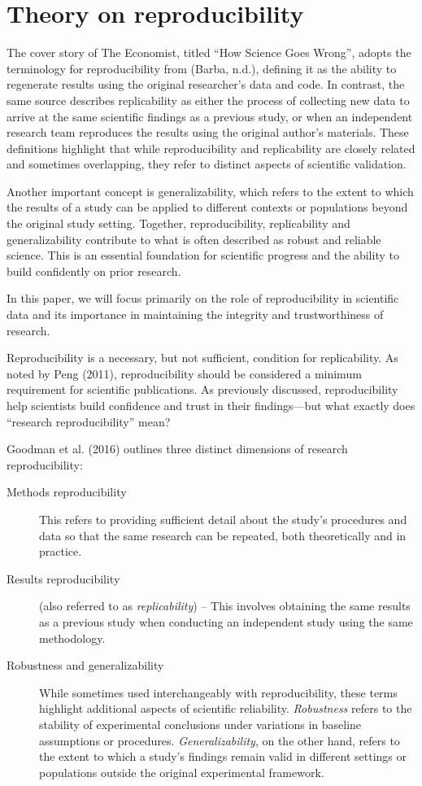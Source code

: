 \documentclass[
  a4paper,
]{article}
\begin{document}
\section{Theory on reproducibility}\label{theory-on-reproducibility}

The cover story of The Economist, titled ``How Science Goes Wrong'',
adopts the terminology for reproducibility from (Barba, n.d.), defining
it as the ability to regenerate results using the original researcher's
data and code. In contrast, the same source describes replicability as
either the process of collecting new data to arrive at the same
scientific findings as a previous study, or when an independent research
team reproduces the results using the original author's materials. These
definitions highlight that while reproducibility and replicability are
closely related and sometimes overlapping, they refer to distinct
aspects of scientific validation.

Another important concept is generalizability, which refers to the
extent to which the results of a study can be applied to different
contexts or populations beyond the original study setting. Together,
reproducibility, replicability and generalizability contribute to what
is often described as robust and reliable science. This is an essential
foundation for scientific progress and the ability to build confidently
on prior research.

In this paper, we will focus primarily on the role of reproducibility in
scientific data and its importance in maintaining the integrity and
trustworthiness of research.

Reproducibility is a necessary, but not sufficient, condition for
replicability. As noted by Peng (2011), reproducibility should be
considered a minimum requirement for scientific publications. As
previously discussed, reproducibility help scientists build confidence
and trust in their findings---but what exactly does ``research
reproducibility'' mean?

Goodman et al. (2016) outlines three distinct dimensions of research
reproducibility:

\begin{description}
\item[Methods reproducibility]
This refers to providing sufficient detail about the study's procedures
and data so that the same research can be repeated, both theoretically
and in practice.
\item[Results reproducibility]
(also referred to as \emph{replicability}) -- This involves obtaining
the same results as a previous study when conducting an independent
study using the same methodology.
\item[Robustness and generalizability]
While sometimes used interchangeably with reproducibility, these terms
highlight additional aspects of scientific reliability.
\emph{Robustness} refers to the stability of experimental conclusions
under variations in baseline assumptions or procedures.
\emph{Generalizability}, on the other hand, refers to the extent to
which a study's findings remain valid in different settings or
populations outside the original experimental framework.
\end{description}
\end{document}
